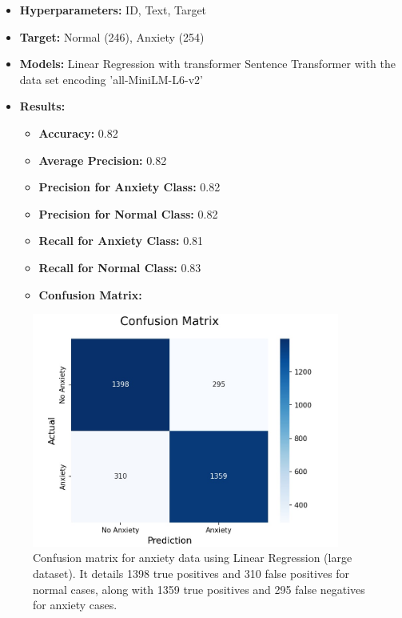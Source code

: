 \documentclass[runningheads,a4paper,11pt]{report}
\begin{document}
\begin{itemize}
    \item \textbf{Hyperparameters:} ID, Text, Target
    \item \textbf{Target:} Normal (246), Anxiety (254)
    \item \textbf{Models:} Linear Regression with transformer Sentence Transformer with the data set encoding 'all-MiniLM-L6-v2'
    \item \textbf{Results:}
    \begin{itemize}
        \item \textbf{Accuracy:} 0.82
        \item \textbf{Average Precision:} 0.82
        \item \textbf{Precision for Anxiety Class:} 0.82
        \item \textbf{Precision for Normal Class:} 0.82
        \item \textbf{Recall for Anxiety Class:} 0.81
        \item \textbf{Recall for Normal Class:} 0.83
        \item \textbf{Confusion Matrix:}
    \end{itemize}
\end{itemize}

\begin{figure}[h]
\centering
\includegraphics[width=0.9\textwidth]{Anxiety-Data-LinearRegression.jpg}
\caption[Confusion matrix for anxiety data (linear regression)]{Confusion matrix for anxiety data using Linear Regression (large dataset). It details 1398 true positives and 310 false positives for normal cases, along with 1359 true positives and 295 false negatives for anxiety cases.}
\end{figure}
\end{document}
